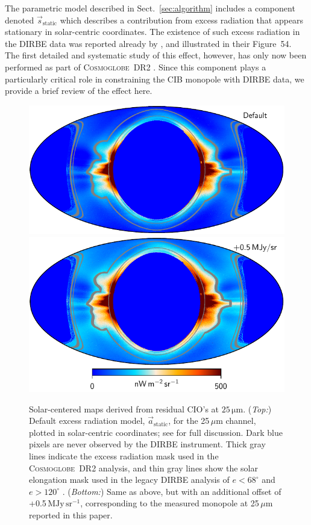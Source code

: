 \documentclass{aa}
\newcommand{\s}[0]{\vec{s}}
\renewcommand{\a}[0]{\vec{a}}
\newcommand{\cosmoglobe}{\textsc{Cosmoglobe}}
\begin{document}
The parametric model described in Sect.~\ref{sec:algorithm} includes a
component denoted $\s_{\mathrm{static}}$ which describes a
contribution from excess radiation that appears stationary in
solar-centric coordinates. The existence of such excess radiation in
the DIRBE data was reported already by \citet{leinert:1998}, and
illustrated in their Figure~54. The first detailed and systematic
study of this effect, however, has only now been performed as part of
\cosmoglobe\ DR2 \citep{CG02_01}. Since this component plays a
particularly critical role in constraining the CIB monopole with DIRBE
data, we provide a brief review of the effect here.

\begin{figure}
  \centering
  \includegraphics[width=\linewidth]{figs/solarmap_06_v2_mono0.pdf}\\
  \includegraphics[width=\linewidth]{figs/solarmap_06_v2_mono5.pdf}
	\caption{Solar-centered maps derived from residual CIO's at $25\,\mathrm{\mu m}$. (\emph{Top:}) Default excess radiation model, $\a_{\mathrm{static}}$, for the 25\,$\mu$m channel, plotted in solar-centric coordinates; see \citet{CG02_01} for full discussion. Dark blue pixels are never observed by the DIRBE instrument. Thick gray lines indicate the excess radiation mask used in the \cosmoglobe\ DR2 analysis, and thin gray lines show the solar elongation mask used in the legacy DIRBE analysis of $e < 68^{\circ}$ and $e >120^{\circ}$ \citep{kelsall1998}. (\emph{Bottom:}) Same as above, but with an additional offset of +0.5\,$\mathrm{MJy\,sr^{-1}}$, corresponding to the measured monopole at 25\,$\mu$m reported in this paper.}
  \label{fig:sidelobe}
\end{figure}
\end{document}
